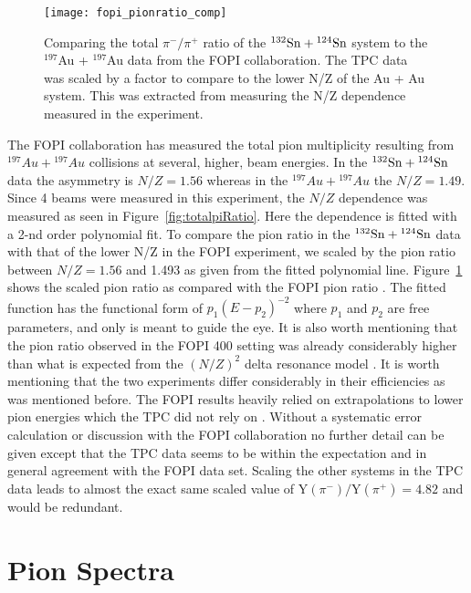 \begin{figure}[!htb]
\centering
\texttt{[image: fopi\_pionratio\_comp]}
\caption{Comparing the total $\pi^-/\pi^+$ ratio of the ${}^{132}\mathrm{Sn} + {}^{124}\mathrm{Sn}$ system to the ${}^{197}$Au + ${}^{197}$Au data from the FOPI collaboration. The \spirit TPC data was scaled by a factor to compare to the lower N/Z of the Au + Au system. This was extracted from measuring the N/Z dependence measured in the experiment. }
\label{fig:fopiPionRatio}
\end{figure}

The FOPI collaboration has measured the total pion multiplicity resulting from ${}^{197}Au + {}^{197}Au$ collisions at several, higher, beam energies. In the ${}^{132}\mathrm{Sn} + {}^{124}\mathrm{Sn}$ data the asymmetry is $N/Z=1.56$ whereas in the ${}^{197}Au + {}^{197}Au$ the $N/Z=1.49$. Since 4 beams were measured in this experiment, the $N/Z$ dependence was measured as seen in Figure~\ref{fig:totalpiRatio}. Here the dependence is fitted with a 2-nd order polynomial fit. To compare the pion ratio in the ${}^{132}\mathrm{Sn} + {}^{124}\mathrm{Sn}$ data with that of the lower N/Z in the FOPI experiment, we scaled by the pion ratio between $N/Z=1.56$ and 1.493 as given from the fitted polynomial line. Figure~\ref{fig:fopiPionRatio} shows the scaled pion ratio as compared with the FOPI pion ratio \cite{fopi}. The fitted function has the functional form of $p_1(E - p_2)^{-2}$ where $p_1$ and $p_2$ are free parameters, and only is meant to guide the eye. It is also worth mentioning that the pion ratio observed in the FOPI \SI{400}{\MeVA} setting was already considerably higher than what is expected from the $(N/Z)^2$ delta resonance model \cite{baoan_piprod1,baoan_piprod2}. It is worth mentioning that the two experiments differ considerably in their efficiencies as was mentioned before. The FOPI results heavily relied on extrapolations to lower pion energies which the \spirit TPC did not rely on \cite{fopi}. Without a systematic error calculation or discussion with the FOPI collaboration no further detail can be given except that the \spirit TPC data seems to be within the expectation and in general agreement with the FOPI data set. Scaling the other systems in the \spirit TPC data leads to almost the exact same scaled value of $\mathrm{Y}(\pi^-)/\mathrm{Y}(\pi^+) = \num{4.82}$ and would be redundant. 




\section{Pion Spectra}
\label{sec:pionSpectra}


